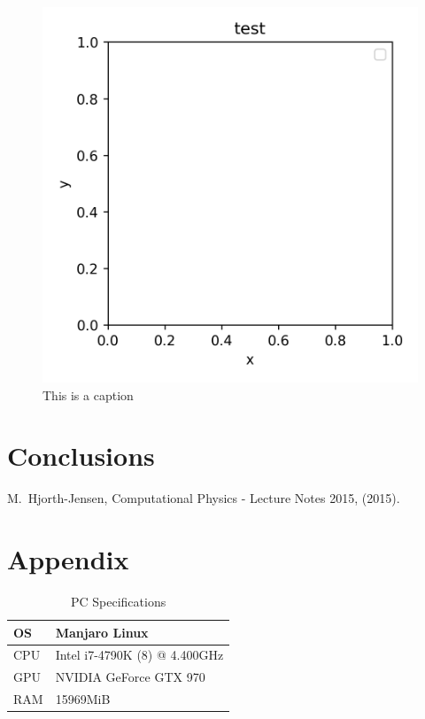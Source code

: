 \documentclass[10pt,showpacs,preprintnumbers,footinbib,amsmath,amssymb,aps,prl,twocolumn,groupedaddress,superscriptaddress,showkeys]{revtex4-1}
\begin{document}
  \begin{figure}[hbtp]
    \center
    \includegraphics[scale=.7]{figs/testfile.png}
    \caption{This is a caption}
  \end{figure}



\section{Conclusions}

\begin{thebibliography}{99}
 M.~Hjorth-Jensen, Computational Physics - Lecture Notes 2015, (2015).
\end{thebibliography}

\newpage

\appendix
  \section{Appendix}
  \begin{table}[h]
  \caption{PC Specifications}
  \begin{tabular}{|l|l|}
    \hline
    OS & Manjaro Linux \\ \hline
    CPU & Intel i7-4790K (8) @ 4.400GHz \\ \hline
    GPU & NVIDIA GeForce GTX 970  \\ \hline
    RAM & 15969MiB \\ \hline
  \end{tabular}
  \label{tab:specs}
  \end{table}
\end{document}
